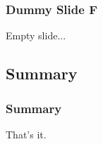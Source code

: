 \begin{frame}[fragile]
\frametitle{Dummy Slide F}
Empty slide...


\end{frame}
\subsection{Summary}
\frame{\tableofcontents[sectionstyle=show/hide,subsectionstyle=show/shaded/hide]}

\begin{frame}[fragile]
\frametitle{Summary}
That's it.


\end{frame}
